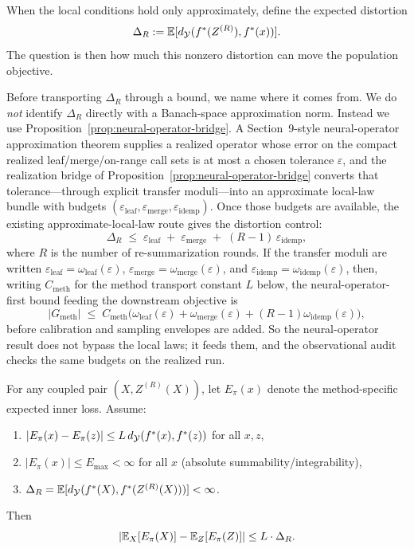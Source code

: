 When the local conditions hold only approximately, define the expected distortion
\[
\Delta_R := \mathbb{E}[d_{\mathcal{Y}}(f^\ast(Z^{(R)}), f^\ast(x))].
\]
The question is then how much this nonzero distortion can move the population objective.

Before transporting $\Delta_R$ through a bound, we name where it
comes from. We do \emph{not} identify $\Delta_R$ directly with a
Banach-space approximation norm. Instead we use
Proposition~\ref{prop:neural-operator-bridge}. A Section~9-style
neural-operator approximation theorem supplies a realized operator whose
error on the compact realized leaf/merge/on-range call sets is at most a
chosen tolerance $\varepsilon$, and the realization bridge of
Proposition~\ref{prop:neural-operator-bridge} converts that
tolerance---through explicit transfer moduli---into an approximate
local-law bundle with budgets
$(\varepsilon_{\mathrm{leaf}}, \varepsilon_{\mathrm{merge}},
\varepsilon_{\mathrm{idemp}})$. Once those budgets are available, the
existing approximate-local-law route gives the distortion control:
\[
\Delta_R \;\le\;
\varepsilon_{\mathrm{leaf}}
\;+\;
\varepsilon_{\mathrm{merge}}
\;+\;
(R-1)\,\varepsilon_{\mathrm{idemp}},
\]
where $R$ is the number of re-summarization rounds. If the transfer
moduli are written
$\varepsilon_{\mathrm{leaf}}=\omega_{\mathrm{leaf}}(\varepsilon)$,
$\varepsilon_{\mathrm{merge}}=\omega_{\mathrm{merge}}(\varepsilon)$, and
$\varepsilon_{\mathrm{idemp}}=\omega_{\mathrm{idemp}}(\varepsilon)$,
then, writing $C_{\mathrm{meth}}$ for the method transport constant $L$
below, the neural-operator-first bound feeding the downstream objective is
\[
|G_{\mathrm{meth}}|
\;\le\;
C_{\mathrm{meth}}\Big(
\omega_{\mathrm{leaf}}(\varepsilon)
+\omega_{\mathrm{merge}}(\varepsilon)
+(R-1)\omega_{\mathrm{idemp}}(\varepsilon)
\Big),
\]
before calibration and sampling envelopes are added. So the
neural-operator result does not bypass the local laws; it feeds them,
and the observational audit checks the same budgets on the realized run.

\begin{theorem}\label{thm:unified-gap}
For any coupled pair $(X, Z^{(R)}(X))$, let $E_\pi(x)$ denote the method-specific expected inner loss. Assume:
\begin{enumerate}[nosep]
\item $|E_\pi(x)-E_\pi(z)| \le L\,d_{\mathcal{Y}}(f^\ast(x),f^\ast(z))$ for all $x,z$,
\item $|E_\pi(x)| \le E_{\max} < \infty$ for all $x$ (absolute summability/integrability),
\item $\Delta_R = \mathbb{E}[d_{\mathcal{Y}}(f^\ast(X),f^\ast(Z^{(R)}(X)))] < \infty$.
\end{enumerate}
Then
\[
\left| \mathbb{E}_X[E_\pi(X)] - \mathbb{E}_Z[E_\pi(Z)] \right| \le L \cdot \Delta_R.
\]
\end{theorem}


